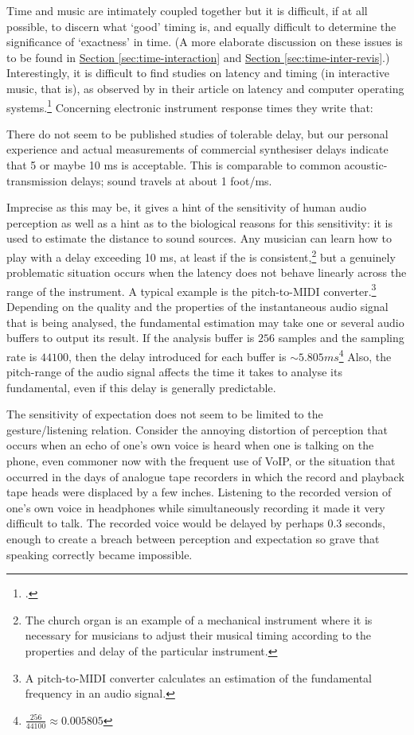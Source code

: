 Time and music are intimately coupled together but it is difficult, if at all possible, to discern what `good' timing is, and equally difficult to determine the significance of `exactness' in time. (A more elaborate discussion on these issues is to be found in \hyperlink{sec:human-comp-inter:7}{Section \ref*{sec:time-interaction}} and \hyperlink{sec:target:time-inter-revis}{Section \ref*{sec:time-inter-revis}}.) Interestingly, it is difficult to find studies on latency and timing (in interactive music, that is), as observed by \citeauthor{brandt98} in their article on latency and computer operating systems.\footcite{brandt98} Concerning electronic instrument response times they write that:
\begin{squote}
There do not seem to be published studies of tolerable delay, but our personal experience and actual measurements of commercial synthesiser delays indicate that 5 or maybe 10 ms is acceptable. This is comparable to common acoustic-transmission delays; sound travels at about 1 foot/ms.
\end{squote}
Imprecise as this may be, it gives a hint of the sensitivity of human audio perception as well as a hint as to the biological reasons for this sensitivity: it is used to estimate the distance to sound sources. Any musician can learn how to play with a delay exceeding 10 ms, at least if the  is consistent,\footnote{The church organ is an example of a mechanical instrument where it is necessary for musicians to adjust their musical timing according to the properties and delay of the particular instrument.} but a genuinely problematic situation occurs when the latency does not behave linearly across the range of the instrument. A typical example is the pitch-to-MIDI converter.\footnote{A pitch-to-MIDI converter calculates an estimation of the fundamental frequency in an audio signal.} Depending on the quality and the properties of the instantaneous audio signal that is being analysed, the fundamental estimation may take one or several audio buffers to output its result. If the analysis buffer is $256$ samples and the sampling rate is $44100$, then the delay introduced for each buffer is $\sim5.805 ms$\footnote{$\frac{256}{44100}\approx0.005805$} Also, the pitch-range of the audio signal affects the time it takes to analyse its fundamental, even if this delay is generally predictable.

The sensitivity of expectation does not seem to be limited to the gesture/listening relation. Consider the annoying distortion of perception that occurs when an echo of one's own voice is heard when one is talking on the phone, even commoner now with the frequent use of VoIP, or the situation that occurred in the days of analogue tape recorders in which the record and playback tape heads were displaced by a few inches. Listening to the recorded version of one's own voice in headphones while simultaneously recording it made it very difficult to talk. The recorded voice would be delayed by perhaps 0.3 seconds, enough to create a breach between perception and expectation so grave that speaking correctly became impossible.

